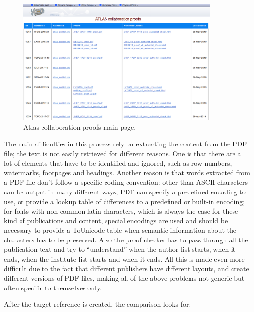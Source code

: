 \begin{figure}[ht!]
  \centering
  \includegraphics[width=0.9\textwidth]{figures/collaboration_proofs.png}
  \caption{Atlas collaboration proofs main page.}
  \label{fig:collaboration_proofs}
\end{figure}
The main difficulties in this process rely on extracting the content from the PDF file; the text is not easily retrieved for different reasons. 
One is that there are a lot of elements that have to be identified and ignored, such as row numbers, watermarks, footpages and headings. 
Another reason is that words extracted from a PDF file don’t follow a specific coding convention: other than ASCII characters can be output in many different ways; PDF can specify a predefined encoding to use, or provide a lookup table of differences to a predefined or built-in encoding; for fonts with non common latin characters, which is always the case for these kind of publications and content, special encodings are used and should be necessary to provide a ToUnicode table when semantic information about the characters has to be preserved. 
Also the proof checker has to pass through all the publication text and try to “understand” when the author list starts, when it ends, when the institute list starts and when it ends.
All this is made even more difficult due to the fact that different publishers have different layouts, and create different versions of PDF files, making all of the above problems not generic but often specific to themselves only.

After the target reference is created, the comparison looks for:

